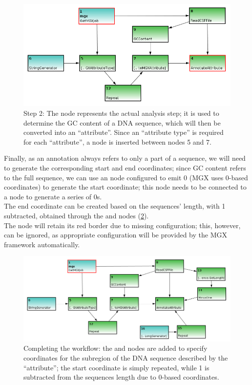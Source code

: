 \begin{figure}[H]
\centering
\includegraphics[width=.8\textwidth]{img/conveyor/annotate_templ3}
\caption[Metagenome annotation]{Step 2: The  node represents the actual analysis step; it is used
to determine the GC content of a DNA sequence, which will then be converted into an ``attribute''. Since an 
``attribute type'' is required for each ``attribute'', a  node is inserted between nodes 5 and 7.}
\label{annot3}
\end{figure}

Finally, as an annotation always refers to only a part of a sequence, we will need to generate the corresponding
start and end coordinates; since GC content refers to the full sequence, we can use an  node
configured to emit 0 (MGX uses 0-based coordinates) to generate the start coordinate; this node needs to be connected to
a  node to generate a series of 0s.\\
The end coordinate can be created based on the sequences' length, with 1 subtracted, obtained through the
 and  nodes (\ref{annot4}).\\
The  node will retain its red border due to missing configuration; this, however, can be
ignored, as appropriate configuration will be provided by the MGX framework automatically.

\begin{figure}[H]
\centering
\includegraphics[width=.9\textwidth]{img/conveyor/annotate_templ4}
\caption[Metagenome annotation]{Completing the workflow: the  and  nodes
are added to specify coordinates for the subregion of the DNA sequence described by the ``attribute''; the
start coordinate is simply repeated, while 1 is subtracted from the sequences length due to 0-based coordinates.}
\label{annot4}
\end{figure}

